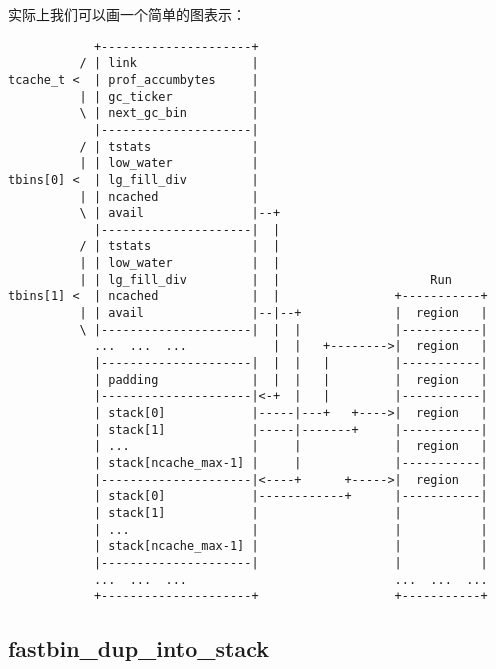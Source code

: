 实际上我们可以画一个简单的图表示：
\begin{verbatim}
            +---------------------+
          / | link                |
tcache_t <  | prof_accumbytes     |
          | | gc_ticker           |
          \ | next_gc_bin         |
            |---------------------|
          / | tstats              |
          | | low_water           |
tbins[0] <  | lg_fill_div         |
          | | ncached             |
          \ | avail               |--+
            |---------------------|  |
          / | tstats              |  |
          | | low_water           |  |
          | | lg_fill_div         |  |                     Run
tbins[1] <  | ncached             |  |                +-----------+
          | | avail               |--|--+             |  region   |
          \ |---------------------|  |  |             |-----------|
            ...  ...  ...            |  |   +-------->|  region   |
            |---------------------|  |  |   |         |-----------|
            | padding             |  |  |   |         |  region   |
            |---------------------|<-+  |   |         |-----------|
            | stack[0]            |-----|---+   +---->|  region   |
            | stack[1]            |-----|-------+     |-----------|
            | ...                 |     |             |  region   |
            | stack[ncache_max-1] |     |             |-----------|
            |---------------------|<----+      +----->|  region   |
            | stack[0]            |------------+      |-----------|
            | stack[1]            |                   |           |
            | ...                 |                   |           |
            | stack[ncache_max-1] |                   |           |
            |---------------------|                   |           |
            ...  ...  ...                             ...  ...  ...
            +---------------------+                   +-----------+
\end{verbatim}

\subsection{fastbin\_dup\_into\_stack}

